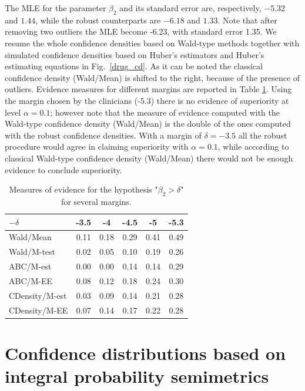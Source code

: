\documentclass[preprint,12pt,authoryear]{elsarticle}
\begin{document}
The MLE for the parameter $\beta_2$ and its standard error are, respectively, $-5.32$ and $1.44$, while the robust  counterparts are $-6.18$ and $1.33$. Note that after removing two outliers the MLE become  -6.23,  with  standard error 1.35. We resume the whole confidence densities based on Wald-type methods together with simulated confidence densities based on Huber's estimators and  Huber's estimating equations in Fig.\ \ref{drug_cd}. As it can be noted the classical confidence density (Wald/Mean) is shifted to the right, because of the presence of outliers. Evidence measures for different margins  are reported in Table \ref{tab_drug}. Using the margin chosen by the clinicians (-5.3) there is no evidence of superiority at  level $\alpha=0.1$; however note that the measure of evidence computed with the Wald-type confidence density (Wald/Mean) is the double of the ones computed with the robust confidence densities.
With a margin of $\delta=-3.5$ all the robust procedure would agree in claiming superiority with $\alpha=0.1$, while according to classical Wald-type confidence density (Wald/Mean) there would not be enough evidence to conclude superiority. 
\begin{table}[ht]
\centering
\begin{tabular}{|l|c|c|c|c|c|}
  \hline
\textbf{$-\delta$} & \textbf{-3.5} & \textbf{-4 }& \textbf{-4.5} & \textbf{-5} & \textbf{-5.3} \\ 
  \hline
 
Wald/Mean & 0.11 & 0.18 & 0.29 & 0.41 & 0.49\\ 
Wald/M-test & 0.02 & 0.05 & 0.10 & 0.19 & 0.26\\ 
ABC/M-est & 0.00 & 0.00 & 0.14 & 0.14 &0.29\\ 
ABC/M-EE & 0.08 & 0.12 & 0.18 & 0.24 &0.30\\ 
CDensity/M-est & 0.03 & 0.09 & 0.14 & 0.21 &0.28\\ 
CDensity/M-EE & 0.07 & 0.14 & 0.17 & 0.22 & 0.28\\ 
    
   \hline
\end{tabular}
\caption{Measures of evidence for the hypothesis "$\beta_2>\delta$"  for several margins. }\label{tab_drug}
\end{table}

 

\section{Confidence distributions based on integral probability semimetrics}
\end{document}
